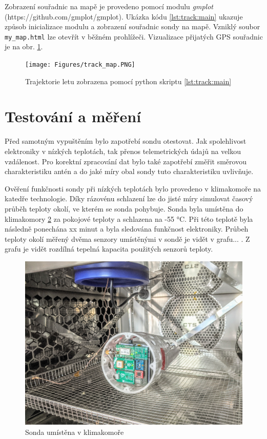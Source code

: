 \documentclass[twoside]{ctuthesis}
\theoremstyle{plain}
\theoremstyle{definition}
\theoremstyle{note}
\begin{document}
	

	Zobrazení souřadnic na mapě je provedeno pomocí modulu \textit{gmplot} (https://github.com/gmplot/gmplot). Ukázka kódu \ref{lst:track:main} ukazuje způsob inicializace modulu a zobrazení souřadnic sondy na mapě. Vzniklý soubor \lstinline|my_map.html| lze otevřít v běžném prohlížeči. Vizualizace přijatých GPS souřadnic je na obr. \ref{fig:track:map}.

	

	\begin{figure}[hbtp]
		\centering
		\texttt{[image: Figures/track\_map.PNG]}
		\caption{Trajektorie letu zobrazena pomocí python skriptu \ref{lst:track:main}}
		\label{fig:track:map}
	\end{figure}










	\section{Testování a měření}
	Před samotným vypuštěním bylo zapotřebí sondu otestovat. Jak spolehlivost elektroniky v nízkých teplotách, tak přenos telemetrických údajů na velkou vzdálenost. Pro korektní zpracování dat bylo také zapotřebí změřit směrovou charakteristiku antén a do jaké míry obal sondy tuto charakteristiku uvlivňuje.

	Ověření funkčnosti sondy při nízkých teplotách bylo provedeno v klimakomoře na katedře technologie. Díky rázovénu schlazení lze do jisté míry simulovat časový průběh teploty okolí, ve kterém se sonda pohybuje. Sonda byla umístěna do klimakomory \ref{fig:sonda:klimakomora} za pokojové teploty a schlazena na -55 °C. Při této teplotě byla následně ponechána xx minut a byla sledována funkčnost elektroniky. Průbeh teploty okolí měřený dvěma senzory umístěnými v sondě je vidět v grafu... . Z grafu je vidět rozdílná tepelná kapacita použitých senzorů teploty. 

	\begin{figure}[hbtp]
		\centering
		\includegraphics[width=.7\textwidth]{Figures/sonda_klimakomora.jpg}
		\caption{Sonda umístěna v klimakomoře}
		\label{fig:sonda:klimakomora}
	\end{figure}
\end{document}
